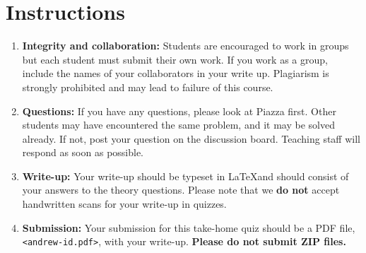 \documentclass[12pt]{article}
\begin{document}
\section*{Instructions}

\begin{enumerate}
    \item \textbf{Integrity and collaboration:} Students are encouraged to work
    in groups but each student must submit their own work. If you work as a
    group, include the names of your collaborators in your write up. Plagiarism
    is strongly prohibited and may lead to failure of this course.

    \item \textbf{Questions:} If you have any questions, please look at Piazza
    first. Other students may have encountered the same problem, and it may be solved
    already. If not, post your question on the discussion board. Teaching staff will
    respond as soon as possible.

    \item \textbf{Write-up:} Your write-up should be typeset in \LaTeX and should consist of your answers to the theory questions. Please note that we
    \textbf{\color{red}do not} accept handwritten scans for your write-up in quizzes.

    \item \textbf{Submission:} Your submission for this take-home quiz should be a
    PDF file, \texttt{<andrew-id.pdf>}, with your write-up. \textbf{\color{red}Please do not submit ZIP files.}
\end{enumerate}
\end{document}
